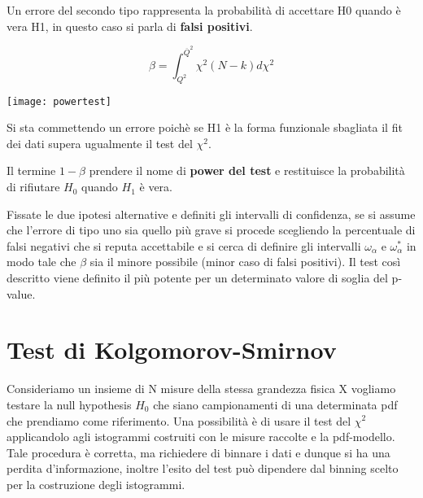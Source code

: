 \documentclass[11pt,a4paper]{book}
\begin{document}
 Un errore del secondo tipo rappresenta la probabilit\`{a} di accettare H0 quando \`{e} vera H1, in questo caso si parla di \textbf{falsi positivi}. 
 \vspace{0.2in}
 
\begin{minipage}{.4\textwidth}
	\begin{equation}
		\beta = \int_{Q^2}^{\overline{Q}^2}\chi^2(N-k)d\chi^2 
	\end{equation}
  \end{minipage}
  \begin{minipage}{.4\textwidth}
    \centering
    \texttt{[image: powertest]}	
  \end{minipage}
\vspace{0.2in}

Si sta commettendo un errore poich\`{e} se H1 \`{e} la forma funzionale sbagliata il fit dei dati supera ugualmente il test del $\chi^2$. 

\noindent Il termine $1-\beta$ prendere il nome di \textbf{power del test} e restituisce la probabilit\`{a} di rifiutare $H_0$ quando $H_1$ \`{e} vera.
\newline

\noindent Fissate le due ipotesi alternative e definiti gli intervalli di confidenza, se si assume che l'errore di tipo uno sia quello pi\`{u} grave si procede scegliendo la percentuale di falsi negativi che si reputa accettabile e si cerca di definire gli intervalli $\omega_\alpha$ e $\omega_\alpha^*$ in modo tale che $\beta$ sia il minore possibile (minor caso di falsi positivi). Il test cos\`{i} descritto viene definito il pi\`{u} potente per un determinato valore di soglia del p-value.

\section{Test di Kolgomorov-Smirnov}

Consideriamo un insieme di N misure della stessa grandezza fisica X vogliamo testare la null hypothesis $H_0$ che siano campionamenti di una determinata pdf che prendiamo come riferimento. Una possibilit\`{a} \`{e} di usare il test del $\chi^2$ applicandolo agli istogrammi costruiti con le misure raccolte e la pdf-modello. Tale procedura \`{e} corretta, ma richiedere di binnare i dati e dunque si ha una perdita d'informazione, inoltre l'esito del test pu\`{o} dipendere dal binning scelto per la costruzione degli istogrammi.
\end{document}
